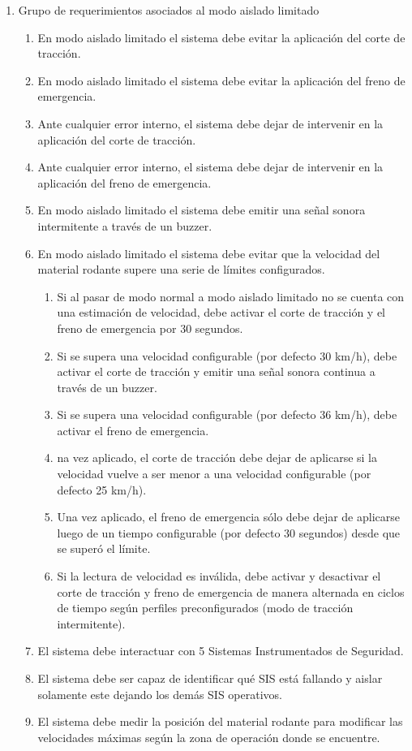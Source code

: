 \begin{enumerate}
    \item Grupo de requerimientos asociados al modo aislado limitado
    \begin{enumerate}
        \item En modo aislado limitado el sistema debe evitar la aplicación del corte de tracción.
        \item En modo aislado limitado el sistema debe evitar la aplicación del freno de emergencia.
        \item Ante cualquier error interno, el sistema debe dejar de intervenir en la aplicación del corte de tracción.
        \item Ante cualquier error interno, el sistema debe dejar de intervenir en la aplicación del freno de emergencia.
        \item En modo aislado limitado el sistema debe emitir una señal sonora intermitente a través de un buzzer.
        \item En modo aislado limitado el sistema debe evitar que la velocidad del material rodante supere una serie de límites configurados.
        \begin{enumerate}
            \item Si al pasar de modo normal a modo aislado limitado no se cuenta con una estimación de velocidad, debe activar el corte de tracción y el freno de emergencia por 30 segundos.
            \item Si se supera una velocidad configurable (por defecto 30 km/h), debe activar el corte de tracción y emitir una señal sonora continua a través de un buzzer.
            \item Si se supera una velocidad configurable (por defecto 36 km/h), debe activar el freno de emergencia.
            \item na vez aplicado, el corte de tracción debe dejar de aplicarse si la velocidad vuelve a ser menor a una velocidad configurable (por defecto 25 km/h).
            \item Una vez aplicado, el freno de emergencia sólo debe dejar de aplicarse luego de un tiempo configurable (por defecto 30 segundos) desde que se superó el límite.
            \item Si la lectura de velocidad es inválida, debe activar y desactivar el corte de tracción y freno de emergencia de manera alternada en ciclos de tiempo según perfiles preconfigurados (modo de tracción intermitente).
        \end{enumerate}
        \item El sistema debe interactuar con 5 Sistemas Instrumentados de Seguridad.
        \item El sistema debe ser capaz de identificar qué SIS está fallando y aislar solamente este dejando los demás SIS operativos.
        \item El sistema debe medir la posición del material rodante para modificar las velocidades máximas según la zona de operación donde se encuentre.
    \end{enumerate}
       

\end{enumerate}
